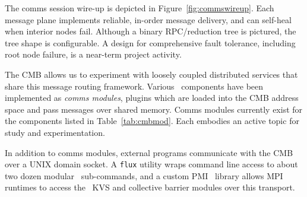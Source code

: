 The comms session wire-up is depicted in Figure~\ref{fig:commswireup}.
Each message plane implements reliable, in-order message delivery, and
can self-heal when interior nodes fail.
Although a binary RPC/reduction tree is pictured, the tree shape is
configurable.
A design for comprehensive fault tolerance, including root node failure,
is a near-term project activity.

The CMB allows us to experiment with loosely coupled distributed services
that share this message routing framework. Various \flux\ components have
been implemented as {\em comms modules}, plugins which are loaded into the
CMB address space and pass messages over shared memory.
Comms modules currently exist for the components listed
in Table~\ref{tab:cmbmod}.
Each embodies an active topic for study and experimentation.

In addition to comms modules, external programs communicate with the CMB
over a UNIX domain socket.  A {\tt flux} utility wraps command line access
to about two dozen modular \flux\ sub-commands, and a custom PMI~\cite{PMI2}
library allows MPI runtimes to access the \flux\ KVS and collective barrier
modules over this transport.

